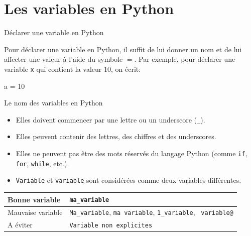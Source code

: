 \def\level{Première}  %
\def\course{NSI}
\def\chaptername{Constructions élémentaires} %
\def\docname{LP01}        %

\pagestyle{cours_FP}
\makeheader{} %


\section{Les variables en Python}

\begin{easybox}{Déclarer une variable en Python}

	Pour déclarer une variable en Python, il suffit de lui donner un nom et de lui affecter une valeur à l'aide du symbole $=$. Par exemple, pour déclarer une variable \texttt{x} qui contient la valeur 10, on écrit:

\begin{minipage}{0.48\linewidth}
	\begin{CodePythontexAlt}[Largeur=1\linewidth,Centre,Lignes=true,PremLigne=1, Lignes=false,]{}
    a = 10
    \end{CodePythontexAlt}
\end{minipage}\hfill{}
\begin{minipage}{0.48\linewidth}
\begin{scratch}
\end{scratch}
\end{minipage}
\end{easybox}


\begin{easybox}{Le nom des variables en Python}
	\begin{itemize}
		\item Elles doivent commencer par une lettre ou un underscore (\texttt{\_}).
		\item Elles peuvent contenir des lettres, des chiffres et des underscores.
		\item Elles ne peuvent pas être des mots réservés du langage Python (comme \texttt{if}, \texttt{for}, \texttt{while}, etc.).
		\item \texttt{Variable} et \texttt{variable} sont considérées comme deux variables différentes.
	\end{itemize}
\end{easybox}

\begin{exemple}{}

	  \renewcommand{\arraystretch}{1.}
    \begin{tabular}{|l|p{12cm}|}
    \hline
    Bonne variable & \verb+ma_variable+ \\ \hline
    Mauvaise variable & \verb+Ma_variable+,  \verb+ma variable+, \verb+1_variable+, \verb+ variable@+ \\ \hline
    A éviter    & \verb+Variable non explicites+ \\ \hline
    \end{tabular}
\end{exemple}

